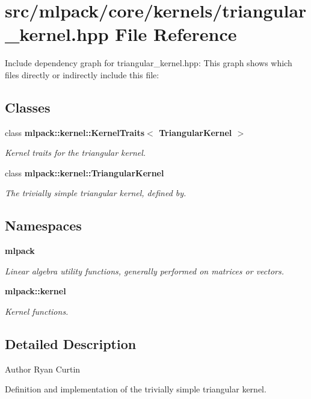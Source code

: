\section{src/mlpack/core/kernels/triangular\-\_\-kernel.hpp File Reference}
\label{triangular__kernel_8hpp}
Include dependency graph for triangular\-\_\-kernel.\-hpp\-:
This graph shows which files directly or indirectly include this file\-:
\subsection*{Classes}
\begin{DoxyCompactItemize}
\item 
class {\bf mlpack\-::kernel\-::\-Kernel\-Traits$<$ Triangular\-Kernel $>$}
\begin{DoxyCompactList}\small\item\em Kernel traits for the triangular kernel. \end{DoxyCompactList}\item 
class {\bf mlpack\-::kernel\-::\-Triangular\-Kernel}
\begin{DoxyCompactList}\small\item\em The trivially simple triangular kernel, defined by. \end{DoxyCompactList}\end{DoxyCompactItemize}
\subsection*{Namespaces}
\begin{DoxyCompactItemize}
\item 
{\bf mlpack}
\begin{DoxyCompactList}\small\item\em Linear algebra utility functions, generally performed on matrices or vectors. \end{DoxyCompactList}\item 
{\bf mlpack\-::kernel}
\begin{DoxyCompactList}\small\item\em Kernel functions. \end{DoxyCompactList}\end{DoxyCompactItemize}


\subsection{Detailed Description}
\begin{DoxyAuthor}{Author}
Ryan Curtin
\end{DoxyAuthor}
Definition and implementation of the trivially simple triangular kernel.

